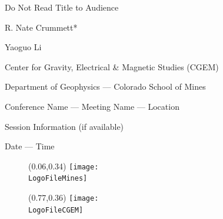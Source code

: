 \documentclass[dark]{cgem-presentation}
\newcommand{\PresentationTitle}{Do Not Read Title to Audience}
\newcommand{\PresentationFirstAuthor}{R. Nate Crummett}
\newcommand{\PresentationSecondAuthor}{Yaoguo Li}
\newcommand{\PresentationAffiliationCGEM}{Center for Gravity, Electrical \& Magnetic Studies}
\newcommand{\PresentationAffiliationGeophysics}{Department of Geophysics}
\newcommand{\PresentationAffiliationMines}{Colorado School of Mines}
\newcommand{\PresentationConferenceName}{Conference Name}
\newcommand{\PresentationMeetingName}{Meeting Name}
\newcommand{\PresentationLocation}{Location}
\newcommand{\PresentationInformation}{Session Information (if available)}
\newcommand{\PresentationDate}{Date}
\newcommand{\PresentationTime}{Time}
\begin{document}
  \begin{frame}[plain]
    \begin{center}
      \vspace{1cm}
      \Huge
      \PresentationTitle{}
      \par
      \vspace{1cm}
      { \color{SecondColor}
        \huge
        \PresentationFirstAuthor{}*
        \par
        \vspace{2mm}
        \PresentationSecondAuthor{}
        \par
      }
      \vspace{1.2cm}
      { \itshape
        { \color{SecondColor}
          \Large
          \PresentationAffiliationCGEM{} (CGEM)
          \par
          \large
          \PresentationAffiliationGeophysics{} --- %
            \PresentationAffiliationMines{}
          \par
        }
        \vspace{2mm}
        \normalsize
        \PresentationConferenceName{} --- %
          \PresentationMeetingName{} --- %
          \PresentationLocation{}
        \par
        \PresentationInformation{}
        \par
        \PresentationDate{} --- %
          \PresentationTime{}
        \par
      }
    \end{center}

    \begin{figure}
      \begin{textblock*}{2.7cm}(0.06\paperwidth,0.34\paperheight)
        \texttt{[image: \\LogoFileMines]}
      \end{textblock*}
    \end{figure}

    \begin{figure}
      \vspace*{-11.09294pt}
      \begin{textblock*}{2.85cm}(0.77\paperwidth,0.36\paperheight)
        \texttt{[image: \\LogoFileCGEM]}
      \end{textblock*}
    \end{figure}

  \end{frame}
\end{document}
